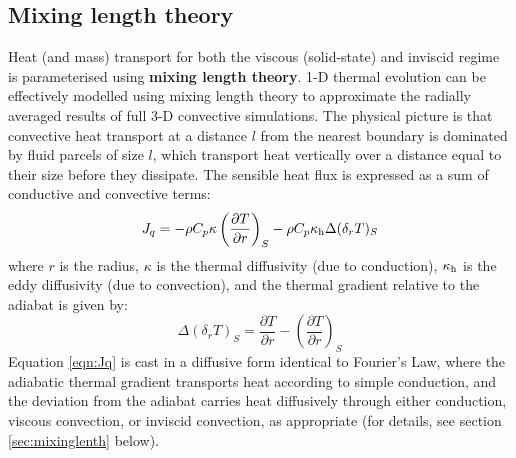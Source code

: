 \subsection{Mixing length theory}
Heat (and mass) transport for both the viscous (solid-state) and inviscid regime is parameterised using \textbf{mixing length theory}.  1-D thermal evolution can be effectively modelled using mixing length theory to approximate the radially averaged results of full 3-D convective simulations.  The physical picture is that convective heat transport at a distance $l$ from the nearest boundary is dominated by fluid parcels of size $l$, which transport heat vertically over a distance equal to their size before they dissipate.  The sensible heat flux is expressed as a sum of conductive and convective terms:
\begin{equation}
J_q = -\rho C_p \kappa \left( \frac{\partial T}{\partial r} \right)_S - \rho C_p \kappa_{\rm h}\Delta (\delta_r T)_S
\label{eqn:Jq}
\end{equation}
where $r$ is the radius, $\kappa$ is the thermal diffusivity (due to conduction), $\kappa_{\rm h}$ is the eddy diffusivity (due to convection), and the thermal gradient relative to the adiabat is given by:
\begin{equation}
\label{eqn:thermgrad}
\Delta (\delta_r T)_S =  \frac{\partial T}{\partial r} - \left( \frac{\partial T}{\partial r} \right)_S 
\end{equation}
Equation \ref{eqn:Jq} is cast in a diffusive form identical to Fourier's Law, where the adiabatic thermal gradient transports heat according to simple conduction, and the deviation from the adiabat carries heat diffusively through either conduction, viscous convection, or inviscid convection, as appropriate (for details, see section \ref{sec:mixinglenth} below).


